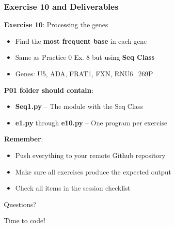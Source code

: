\documentclass[xcolor=table]{beamer}
\begin{document}
\begin{frame}
\frametitle{Exercise 10 and Deliverables}

\textbf{Exercise 10}: Processing the genes
\begin{itemize}
\item Find the \textbf{most frequent base} in each gene
\item Same as Practice 0 Ex. 8 but using \textbf{Seq Class}
\item Genes: U5, ADA, FRAT1, FXN, RNU6\_269P
\end{itemize}

\vspace{0.5cm}

\textbf{P01 folder should contain}:

\begin{itemize}
\item \textbf{Seq1.py} -- The module with the Seq Class
\item \textbf{e1.py} through \textbf{e10.py} -- One program per exercise
\end{itemize}

\vspace{0.3cm}

\textbf{Remember}:
\begin{itemize}
\item Push everything to your remote Github repository
\item Make sure all exercises produce the expected output
\item Check all items in the session checklist
\end{itemize}

\end{frame}


\begin{frame}
\begin{center}
\Huge{Questions?}

\vspace{1cm}

\Large{Time to code!}
\end{center}
\end{frame}
\end{document}
